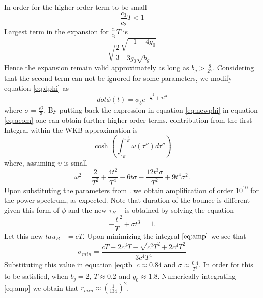 \documentclass[12pt,a4paper]{article}
\numberwithin{equation}{section}
\numberwithin{equation}{section}
\begin{document}
In  order for the higher order term to be small
\begin{equation}
    \frac{c_3}{c_2} T < 1 
\end{equation}
Largest term in the expansion for $\frac{c_3}{c_2} T$ is
\begin{equation}
    \sqrt{\frac{2}{3}} \frac{\sqrt{-1+4g_0}}{3 g_0\sqrt{b_g}}
\end{equation}
Hence the expansion remain valid approximately as long as $b_g>\frac{8}{27}$. Considering that the second term can not be ignored for some parameters, we modify equation \eqref{eq:dphi} as
\begin{equation}
    dot{\phi}(t) = \phi_b e^{-\frac{t}{T}^2+ \sigma t^3} 
    \label{eq:newphi}
\end{equation}
where $\sigma = \frac{c2}{3}$. By putting back the expression in equation \eqref{eq:newphi} in equation \eqref{eq:aeom} one can obtain further higher order terms.  contribution from the first  Integral within the WKB approximation is 
\begin{equation}
     \cosh(\int_{\tau_{B}^-}^{\tau_{B}^+} \omega(\tau'') d\tau'') 
     \label{eq:amp}
\end{equation}
where, assuming $\upsilon$ is small
\begin{equation}
    \omega^2 =   \frac{2}{T^2}+\frac{4 t^2}{T^4}-6 t \sigma -\frac{12 t^3 \sigma }{T^2}+ 9t^4 \sigma^2.
\end{equation}
Upon substituting the parameters from . we obtain amplification of order $10^{10}$ for the power spectrum, as expected. Note that duration of the bounce is different given this form of $\phi$ and the new $\tau_{B-}$ is obtained by solving the equation 
\begin{equation}
    -\frac{t}{T}^2+ \sigma t^3 = 1. 
    \label{eq:tb}
\end{equation}
Let this new $tau_{B-} = c T$. Upon minimizing the integral $\eqref{eq:amp}$ we see that
\begin{equation}
    \sigma_{min} = \frac{cT+2 c^3 T-\sqrt{c^2 T^2+2c^4T^2}}{3 c^4 T^4}
\end{equation}
Substituting this value in equation \eqref{eq:tb} $c\approx0.84$ and $\sigma \approx \frac{0.4}{T^3}$. In order for this to be satisfied, when $b_g=2$, $T\approx0.2$ and $g_0 \approx 1.8 $. Numerically integrating \eqref{eq:amp} we obtain that $r_{min} \approx (\frac{1}{134})^2$. 
\end{document}
